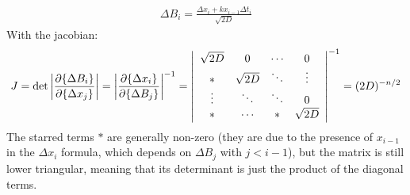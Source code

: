 \documentclass[../template.tex]{subfiles}
\begin{document}
\begin{exo}
    \begin{align*}
        \Delta B_i = \frac{\Delta x_i + k x_{i-1} \Delta t_i}{\sqrt{2D}}
    \end{align*}
    With the jacobian:
    \begin{align*}
        J = \operatorname{det} \left|\pdv{\{\Delta B_i\}}{\{\Delta x_j\}} \right| = \left|\pdv{\{\Delta x_i\}}{\{\Delta B_j\}} \right|^{-1} = \left|\begin{array}{cccc}
        \sqrt{2D} & 0 & \cdots & 0 \\ 
        * & \sqrt{2D} & \ddots & \vdots \\ 
        \vdots & \ddots & \ddots & 0 \\ 
        * & \cdots & * & \sqrt{2D}
        \end{array}\right|^{-1} = (2D)^{-n/2}
    \end{align*}
    The starred terms $*$ are generally non-zero (they are due to the presence of $x_{i-1}$ in the $\Delta x_i$ formula, which depends on $\Delta B_j$ with $j < i-1$), but the matrix is still lower triangular, meaning that its determinant is just the product of the diagonal terms.


\end{exo}
\end{document}
